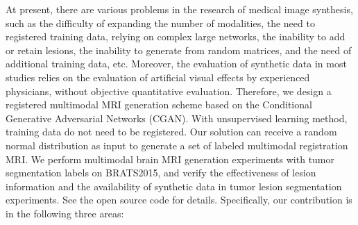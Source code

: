 \documentclass[letterpaper]{article} %
\begin{document}
At present, there are various problems in the research of medical image synthesis, such as the difficulty of expanding the number of modalities, the need to registered training data, relying on complex large networks, the inability to add or retain lesions, the inability to generate from random matrices, and the need of additional training data, etc. Moreover, the evaluation of synthetic data in most studies relies on the evaluation of artificial visual effects by experienced physicians, without objective quantitative evaluation. Therefore, we design a registered multimodal MRI generation scheme based on the Conditional Generative Adversarial Networks (CGAN)\cite{70mirza2014conditional}. With unsupervised learning method, training data do not need to be registered. Our solution can receive a random normal distribution as input to generate a set of labeled multimodal registration MRI. We perform multimodal brain MRI generation experiments with tumor segmentation labels on BRATS2015, and verify the effectiveness of lesion information and the availability of synthetic data in tumor lesion segmentation experiments. See the open source code for details. Specifically, our contribution is in the following three areas:
\end{document}
